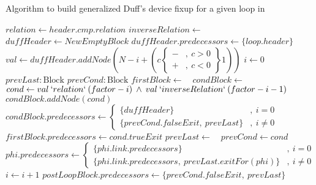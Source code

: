 \begin{algorithm}[H]
    \caption{Algorithm to build generalized Duff's device fixup for a given loop in \libFIRM}
    \label{alg:impl:fixup:duff:create-fixup}
    \begin{algorithmic}
                \State {}
            \EndFor
                    \State {} 
                \EndIf
            \EndFor
            \State $relation \gets header.cmp.relation$
            \State $inverseRelation \gets\text{ }$ 
            \State $duffHeader \gets NewEmptyBlock$
            \State $duffHeader.predecessors \gets \{loop.header\}$
            \State $val \gets duffHeader.addNode(N - i + (c
                \left\{\!\begin{aligned}
                   - &, \medspace c > 0\\
                   + &, \medspace c < 0
                \end{aligned}\right\} 1)
            )$
            \State $i \gets 0$
            \State $prevLast: \text{Block}$
            \State $prevCond: \text{Block}$
                \State $firstBlock \gets\text{ }$ 
                \State $condBlock \gets\text{ }$ 
                \State $cond \gets val \medspace `relation` \medspace (factor - i) \medspace \wedge \medspace val \medspace `inverseRelation` \medspace (factor - i - 1)$
                \State $condBlock.addNode(cond)$
                \State $condBlock.predecessors \gets \begin{cases}\{duffHeader\} &, \medspace i = 0\\ \{prevCond.falseExit, \medspace prevLast\} &, \medspace i \neq 0\end{cases}$
                \State $firstBlock.predecessors \gets cond.trueExit$
                \State $prevLast \gets\text{ }$ 
                \State $prevCond \gets cond$
                    \State $phi.predecessors \gets \begin{cases}\{phi.link.predecessors\} &, \medspace i = 0\\ \{phi.link.predecessors, \medspace prevLast.exitFor(phi)\} &, \medspace i \neq 0\end{cases}$
                \EndFor
                \State $i \gets i + 1$
            \EndFor
                    \State {}
                \EndIf
            \EndFor
            \State $postLoopBlock.predecessors \gets \{prevCond.falseExit, \medspace prevLast\}$
            \State {} 
        \EndFunction
    \end{algorithmic}
\end{algorithm}